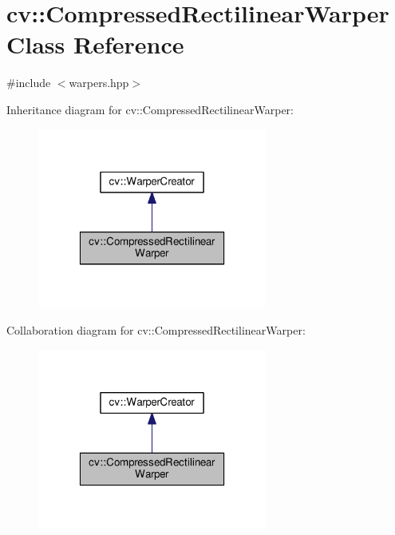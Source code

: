 \hypertarget{classcv_1_1CompressedRectilinearWarper}{\section{cv\-:\-:Compressed\-Rectilinear\-Warper Class Reference}
\label{classcv_1_1CompressedRectilinearWarper}
}


{\ttfamily \#include $<$warpers.\-hpp$>$}



Inheritance diagram for cv\-:\-:Compressed\-Rectilinear\-Warper\-:\nopagebreak
\begin{figure}[H]
\begin{center}
\leavevmode
\includegraphics[width=214pt]{classcv_1_1CompressedRectilinearWarper__inherit__graph}
\end{center}
\end{figure}


Collaboration diagram for cv\-:\-:Compressed\-Rectilinear\-Warper\-:\nopagebreak
\begin{figure}[H]
\begin{center}
\leavevmode
\includegraphics[width=214pt]{classcv_1_1CompressedRectilinearWarper__coll__graph}
\end{center}
\end{figure}
